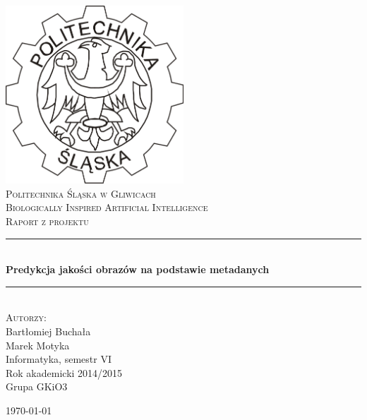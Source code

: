\documentclass[a4paper,twoside]{article}
\newcommand{\HRule}{\rule{\linewidth}{0.5mm}}
\begin{document}
	
	\begin{titlepage}
		\begin{center}
			
			\includegraphics[width=0.5\textwidth]{./img/logo.png}~\\[1cm]
			
			\textsc{\LARGE Politechnika Śląska w Gliwicach}\\[1.5cm]
			
			\textsc{\LARGE Biologically Inspired Artificial Intelligence}\\[0.2cm]
			
			\textsc{\LARGE Raport z projektu}\\[0.2cm]
			
			\HRule \\[0.4cm]
			{ \Huge \bfseries Predykcja jakości obrazów na podstawie metadanych \\[0.4cm] }
			
			\HRule \\[1.5cm]
			
			\textsc{\Large Autorzy:} \\
			Bartłomiej Buchała \\
			Marek Motyka \\[1.0cm]
			
			Informatyka, semestr VI \\
			Rok akademicki 2014/2015 \\
			Grupa GKiO3
			
			\vfill
			
			{\large \today}
			
		\end{center}
	\end{titlepage}
	
\end{document}
